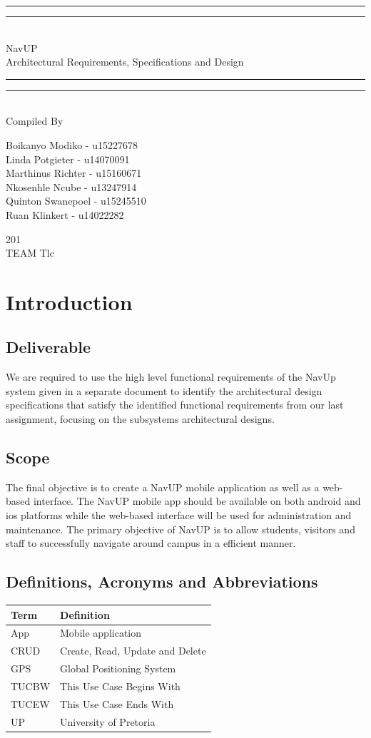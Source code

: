 \documentclass{article}
\newcommand*{\titleGP}{\begingroup
\centering 
\vspace*{\baselineskip}

\rule{\textwidth}{1.6pt}\vspace*{-\baselineskip}\vspace*{2pt}
\rule{\textwidth}{0.4pt}\\[\baselineskip]

{\LARGE NavUP\\ [0.3\baselineskip] Architectural Requirements, Specifications and Design } \\ [0.2\baselineskip]
\rule{\textwidth}{0.4pt}\vspace*{-\baselineskip}\vspace{3.2pt}
\rule{\textwidth}{1.6pt}\\[\baselineskip] %



Compiled By \\[\baselineskip]
{\Large Boikanyo Modiko - u15227678 \\
Linda Potgieter - u14070091 \\
Marthinus Richter - u15160671 \\
Nkosenhle Ncube - u13247914 \\ 
Quinton Swanepoel - u15245510 \\
Ruan Klinkert - u14022282\par} 

\vfill

{\scshape 201} \\[0.3\baselineskip]
{\large TEAM Tlc}\par

\endgroup}
\begin{document}
\titleGP

\newpage

\section{Introduction}

\subsection{Deliverable}
We are required to use the high level functional requirements of the NavUp system given in a separate document to identify the architectural design specifications that satisfy the identified functional requirements from our last assignment, focusing on the subsystems architectural designs.
\subsection{Scope}
The final objective is to create a NavUP mobile application as well as a web-based interface. The NavUP mobile app should be available on both android and ios platforms while the web-based interface will be used for administration and maintenance. The primary objective of NavUP is to allow students, visitors and staff to successfully navigate around campus in a efficient manner.

\subsection{Definitions, Acronyms and Abbreviations}

\begin{table}[ht!]
	
	\centering
	\begin{tabular}{|p{4cm}|p{7cm}|}
		\hline
		\textbf{Term} & \textbf{Definition} \\		
		\hline
        App & Mobile application \\
		\hline
		CRUD & Create, Read, Update and Delete \\
		\hline
		GPS & Global Positioning System \\
		\hline
		TUCBW & This Use Case Begins With \\
		\hline
		TUCEW & This Use Case Ends With \\
		\hline
		UP & University of Pretoria \\
		\hline
	\end{tabular}
\end{table}
\end{document}
